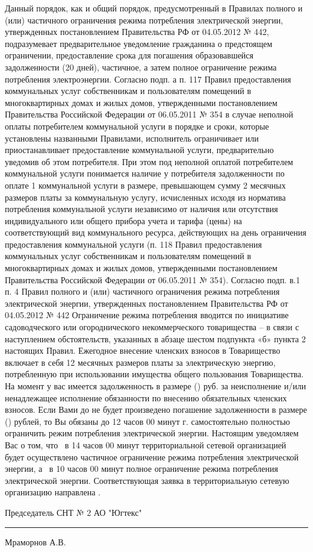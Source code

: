 Данный порядок, как и общий порядок, предусмотренный в Правилах полного и (или) частичного ограничения режима потребления электрической энергии, утвержденных постановлением Правительства РФ от 04.05.2012 № 442, подразумевает предварительное уведомление гражданина о предстоящем ограничении, предоставление срока для погашения образовавшейся задолженности (20 дней), частичное, а затем полное ограничение режима потребления электроэнергии. 
Согласно подп. а п. 117 Правил предоставления коммунальных услуг собственникам и пользователям помещений в многоквартирных домах и жилых домов, утвержденными постановлением Правительства Российской Федерации от 06.05.2011 № 354 в случае неполной оплаты потребителем коммунальной услуги в порядке и сроки, которые установлены названными Правилами, исполнитель ограничивает или приостанавливает предоставление коммунальной услуги, предварительно уведомив об этом потребителя.
При этом под неполной оплатой потребителем коммунальной услуги понимается наличие у потребителя задолженности по оплате 1 коммунальной услуги в размере, превышающем сумму 2 месячных размеров платы за коммунальную услугу, исчисленных исходя из норматива потребления коммунальной услуги независимо от наличия или отсутствия индивидуального или общего прибора учета и тарифа (цены) на соответствующий вид коммунального ресурса, действующих на день ограничения предоставления коммунальной услуги (п. 118 Правил предоставления коммунальных услуг собственникам и пользователям помещений в многоквартирных домах и жилых домов, утвержденными постановлением Правительства Российской Федерации от 06.05.2011 № 354).
Согласно подп. в.1 п. 4 Правил полного и (или) частичного ограничения режима потребления электрической энергии, утвержденных постановлением Правительства РФ от 04.05.2012 № 442 Ограничение режима потребления вводится по инициативе садоводческого или огороднического некоммерческого товарищества – в связи с наступлением обстоятельств, указанных в абзаце шестом подпункта «б» пункта 2 настоящих Правил.
Ежегодное внесение членских взносов в Товарищество включает в себя 12 месячных размеров платы за электрическую энергию, потребленную при использовании имущества общего пользования Товарищества. 
На момент         у вас имеется задолженность в размере    () руб. за неисполнение и/или ненадлежащее исполнение обязанности по внесению  обязательных членских взносов. 
Если Вами до       %
  не будет произведено погашение задолженности в размере  ()            рублей, то Вы обязаны до 12 часов 00 минут  г.        %
  самостоятельно полностью ограничить режим потребления электрической энергии. 
Настоящим уведомляем Вас о том, что  \, в 14 часов 00 минут     территориальной сетевой организацией будет осуществлено частичное ограничение режима потребления электрической энергии, а  \, в 10 часов 00 минут полное ограничение режима потребления электрической энергии.
Соответствующая заявка в территориальную сетевую организацию направлена  .

\vspace{15mm}

\noindent Председатель СНТ № 2 АО "Югтекс" \hfill    \rule{3cm}{0.1 mm}    Мраморнов А.В.


\pagebreak
